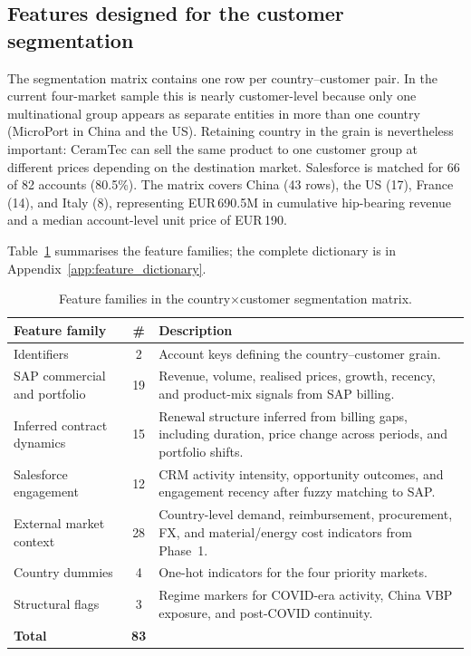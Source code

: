 \documentclass{article}
\begin{document}
\subsection{Features designed for the customer segmentation}

The segmentation matrix contains one row per country--customer pair. In the current four-market sample this is nearly customer-level because only one multinational group appears as separate entities in more than one country (MicroPort in China and the US). Retaining country in the grain is nevertheless important: CeramTec can sell the same product to one customer group at different prices depending on the destination market. Salesforce is matched for 66 of 82 accounts (80.5\%). The matrix covers China (43 rows), the US (17), France (14), and Italy (8), representing EUR\,690.5M in cumulative hip-bearing revenue and a median account-level unit price of EUR\,190.

Table~\ref{tab:phase2_seg_families} summarises the feature families; the complete dictionary is in Appendix~\ref{app:feature_dictionary}.

\begin{table}[H]
\centering
\small
\begin{tabular}{@{}p{3.6cm}c p{7.6cm}@{}}
\toprule
\textbf{Feature family} & \textbf{\#} & \textbf{Description} \\
\midrule
Identifiers & 2 & Account keys defining the country--customer grain. \\
SAP commercial and portfolio & 19 & Revenue, volume, realised prices, growth, recency, and product-mix signals from SAP billing. \\
Inferred contract dynamics & 15 & Renewal structure inferred from billing gaps, including duration, price change across periods, and portfolio shifts. \\
Salesforce engagement & 12 & CRM activity intensity, opportunity outcomes, and engagement recency after fuzzy matching to SAP. \\
External market context & 28 & Country-level demand, reimbursement, procurement, FX, and material/energy cost indicators from Phase~1. \\
Country dummies & 4 & One-hot indicators for the four priority markets. \\
Structural flags & 3 & Regime markers for COVID-era activity, China VBP exposure, and post-COVID continuity. \\
\midrule
\textbf{Total} & \textbf{83} & \\
\bottomrule
\end{tabular}
\caption{Feature families in the country$\times$customer segmentation matrix.}
\label{tab:phase2_seg_families}
\end{table}
\end{document}
